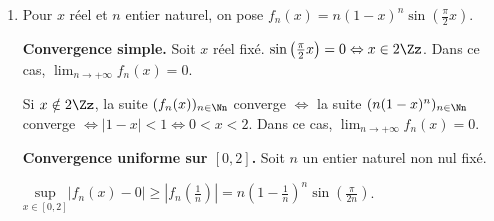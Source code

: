 {{\begin{enumerate}
Si $n$ est pair, la fonction $g_n$ est décroissante sur $\Rr$ et s'annule en $0$.

Si $n$ est impair, la fonction $g_n$ est croissante sur $\Rr^-$, décroissante sur $\Rr^+$ et s'annule en $0$.

Dans les deux cas, si $x\in[a,b]$, $|g_n(x)|\leqslant\text{Max}\{|g_n(a)|,|g_n(b)|\}$ avec égalité effectivement obtenue pour $x=a$ ou $x=b$. Donc 

\begin{center}
$\underset{x\in[a,b]}{\text{sup}}|gn(x)|=\text{Max}\{|g_n(a)|,|g_n(b)|\}=\frac{g_n(a)+g_n(b)+|g_n(a)-g_n(b)|}{2}$.
\end{center}

Cette dernière expression tend vers $0$ quand $n$ tend vers $+\infty$. On en déduit que la suite de fonctions $(f_n)_{n\in\Nn}$ converge uniformément vers $f$ sur tout segment $[a,b]$ contenu dans $\Rr$ ou encore 

\begin{center}
\end{center}

\item  Pour $x$ réel et $n$ entier naturel, on pose $f_n(x) =n(1-x)^n\sin\left(\frac{\pi}{2}x\right)$.

\textbf{Convergence simple.} Soit $x$ réel fixé. $\sin\left(\frac{\pi}{2}x\right)=0\Leftrightarrow x\in 2\Zz$. Dans ce cas, $\lim_{n \rightarrow +\infty}f_n(x) =0$.

Si $x\notin 2\Zz$, la suite $(f_n(x))_{n\in\Nn}$ converge $\Leftrightarrow$ la suite $(n(1-x)^n)_{n\in\Nn}$ converge $\Leftrightarrow |1-x| < 1 \Leftrightarrow 0 < x < 2$. Dans ce cas, $\lim_{n \rightarrow +\infty}f_n(x)=0$.

\begin{center}
\end{center}

\textbf{Convergence uniforme sur $[0,2]$.} Soit  $n$ un entier naturel non nul fixé.

\begin{center}
$\underset{x\in[0,2]}{\text{sup}}|f_n(x)-0|\geqslant\left|f_n\left(\frac{1}{n}\right)\right|=n\left(1-\frac{1}{n}\right)^n\sin\left(\frac{\pi}{2n}\right)$.
\end{center}


\end{enumerate}}}
